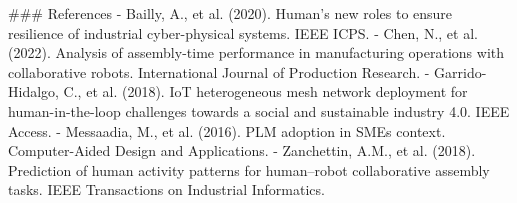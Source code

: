 ### References
- Bailly, A., et al. (2020). Human’s new roles to ensure resilience of industrial cyber-physical systems. IEEE ICPS.
- Chen, N., et al. (2022). Analysis of assembly-time performance in manufacturing operations with collaborative robots. International Journal of Production Research.
- Garrido-Hidalgo, C., et al. (2018). IoT heterogeneous mesh network deployment for human-in-the-loop challenges towards a social and sustainable industry 4.0. IEEE Access.
- Messaadia, M., et al. (2016). PLM adoption in SMEs context. Computer-Aided Design and Applications.
- Zanchettin, A.M., et al. (2018). Prediction of human activity patterns for human–robot collaborative assembly tasks. IEEE Transactions on Industrial Informatics.